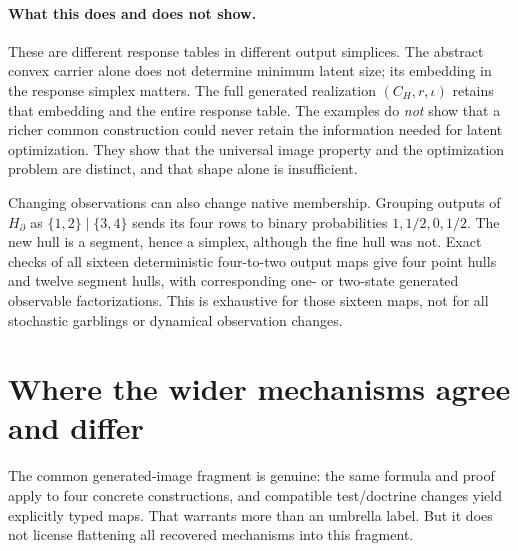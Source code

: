 \documentclass[11pt]{article}
\begin{document}
\paragraph{What this does and does not show.}
These are different response tables in different output simplices. The abstract convex carrier alone does not determine minimum latent size; its embedding in the response simplex matters. The full generated realization $(C_H,r,\iota)$ retains that embedding and the entire response table. The examples do \emph{not} show that a richer common construction could never retain the information needed for latent optimization. They show that the universal image property and the optimization problem are distinct, and that shape alone is insufficient.

Changing observations can also change native membership. Grouping outputs of $H_{\partial}$ as $\{1,2\}\mid\{3,4\}$ sends its four rows to binary probabilities $1,1/2,0,1/2$. The new hull is a segment, hence a simplex, although the fine hull was not. Exact checks of all sixteen deterministic four-to-two output maps give four point hulls and twelve segment hulls, with corresponding one- or two-state generated observable factorizations. This is exhaustive for those sixteen maps, not for all stochastic garblings or dynamical observation changes.

\section{Where the wider mechanisms agree and differ}
\label{sec:prior}

The common generated-image fragment is genuine: the same formula and proof apply to four concrete constructions, and compatible test/doctrine changes yield explicitly typed maps. That warrants more than an umbrella label. But it does not license flattening all recovered mechanisms into this fragment.
\end{document}
